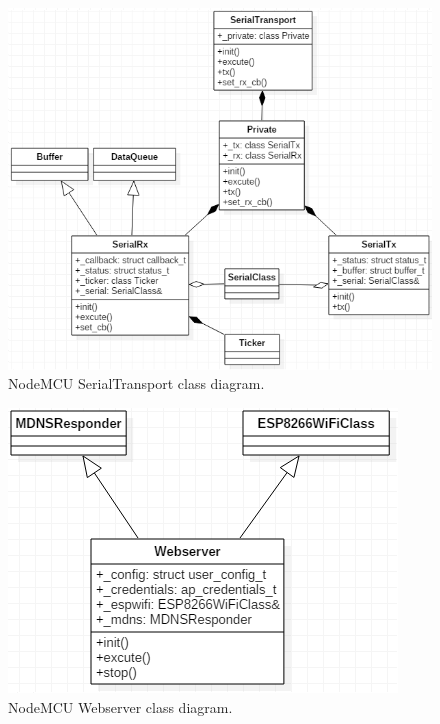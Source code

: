 \documentclass[a4paper,12pt,oneside]{article}
\begin{document}
\begin{figure}[H]
\centering
\includegraphics[scale=.6]{hinh/class_serialtransport.PNG}
\caption{NodeMCU SerialTransport class diagram.}
\end{figure}

\begin{figure}[H]
\centering
\begin{center}
\includegraphics[scale=.8]{hinh/class_webserver.PNG}
\end{center}
\caption{NodeMCU Webserver class diagram.}
\end{figure}
\end{document}
